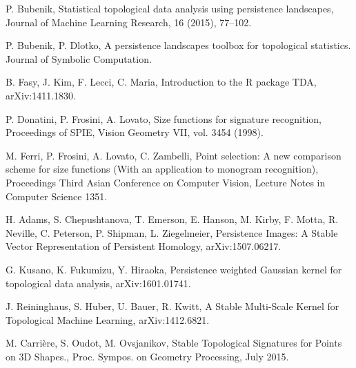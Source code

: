 \documentclass[11pt]{article}
\begin{document}
\begin{thebibliography}{99}
  P. Bubenik, Statistical topological data analysis using persistence landscapes, Journal of Machine Learning Research, 16 (2015), 77–102.

 P. Bubenik, P. Dlotko, A persistence landscapes toolbox for topological statistics. Journal of Symbolic Computation.

 B. Fasy, J. Kim, F. Lecci, C. Maria, Introduction to the R package TDA, arXiv:1411.1830.

 P. Donatini, P. Frosini, A. Lovato, Size functions for signature recognition, Proceedings of SPIE, Vision Geometry VII, vol. 3454
(1998).

 M. Ferri, P. Frosini, A. Lovato, C. Zambelli, Point selection: A new comparison scheme for size functions (With an application to monogram recognition), Proceedings Third Asian Conference on Computer Vision, Lecture Notes in Computer Science 1351.

 H. Adams, S. Chepushtanova, T. Emerson, E. Hanson, M. Kirby, F. Motta, R. Neville, C. Peterson, P. Shipman, L. Ziegelmeier, Persistence Images: A Stable Vector Representation of Persistent Homology, arXiv:1507.06217.

 G. Kusano, K. Fukumizu, Y. Hiraoka, Persistence weighted Gaussian kernel for topological data analysis, arXiv:1601.01741.

 J. Reininghaus, S. Huber, U. Bauer, R. Kwitt, A Stable Multi-Scale Kernel for Topological Machine Learning, arXiv:1412.6821.

 M. Carrière, S. Oudot, M. Ovsjanikov, Stable Topological Signatures for Points on 3D Shapes., Proc. Sympos. on Geometry Processing, July 2015.

\end{thebibliography}
\end{document}
